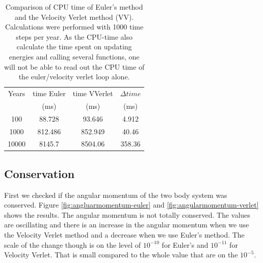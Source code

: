 \begin{table}[H]\caption{Comparison of CPU time of Euler's method and the Velocity Verlet method (VV). Calculations were performed with 1000 time steps per year. As the CPU-time also calculate the time spent on updating energies and calling several functions, one will not be able to read out the CPU time of the euler/velocity verlet loop alone.}\label{tab:CPUtime}
	\begin{tabular}[width=\linewidth]{cccc}
		Years &\small{ time Euler  } & \small{time VVerlet} & \small{$\Delta time $} \\
		& (ms)&(ms) &(ms)\\ \hline 
		    
		100 & 88.728 & 93.646 & 4.912 \\
		1000 & 812.486 & 852.949   &40.46\\	
		10000 & 	8145.7  & 8504.06   &358.36
	\end{tabular}
\end{table}

%	

\subsection{Conservation}

First we checked if the angular momentum of the two body system was conserved. Figure \ref{fig:angluarmomentum-euler} and \ref{fig:angularmomentum-verlet} shows the results. The angular momentum is not totally conserved. The values are oscillating and there is an increase in the angular momentum when we use the Velocity Verlet method and a decrease when we use Euler's method. The scale of the change though is on the level of $10^{-10}$ for Euler's and $10^{-11}$ for Velocity Verlet. That is small compared to the whole value that are on the $10^{-5}$.

